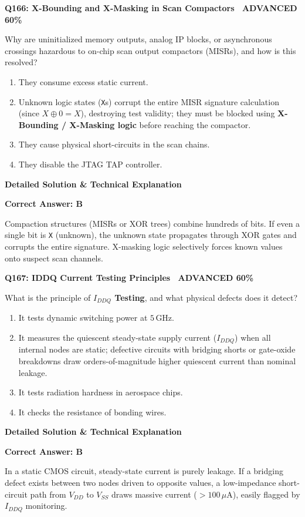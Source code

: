 \documentclass[11pt,a4paper]{article}
\newcommand{\badgeadv}{{\color{white}\colorbox{advred}{\bfseries\sffamily\tiny\ ADVANCED 60\%\ }}}
\newenvironment{qbox}[2]{%
  \begin{mdframed}[style=qstyle]%
  {\bfseries\sffamily\color{primaryblue}#1 \hfill #2}\par\vspace{2pt}%
}{%
  \end{mdframed}%
}
\newenvironment{ansbox}{%
  \begin{mdframed}[style=ansstyle]%
  {\bfseries\sffamily\color{ansgreen}\small Detailed Solution \& Technical Explanation}\par\vspace{2pt}\small%
}{%
  \end{mdframed}%
}
\begin{document}
\begin{qbox}{Q166: X-Bounding and X-Masking in Scan Compactors}{\badgeadv}
Why are uninitialized memory outputs, analog IP blocks, or asynchronous crossings hazardous to on-chip scan output compactors (MISRs), and how is this resolved?
\begin{enumerate}[label=\textbf{\Alph*.}]
  \item They consume excess static current.
  \item Unknown logic states (\texttt{X}s) corrupt the entire MISR signature calculation (since $X \oplus 0 = X$), destroying test validity; they must be blocked using \textbf{X-Bounding / X-Masking logic} before reaching the compactor.
  \item They cause physical short-circuits in the scan chains.
  \item They disable the JTAG TAP controller.
\end{enumerate}
\end{qbox}
\begin{ansbox}
\textbf{Correct Answer: B}

Compaction structures (MISRs or XOR trees) combine hundreds of bits. If even a single bit is \texttt{X} (unknown), the unknown state propagates through XOR gates and corrupts the entire signature. X-masking logic selectively forces known values onto suspect scan channels.
\end{ansbox}

\begin{qbox}{Q167: IDDQ Current Testing Principles}{\badgeadv}
What is the principle of \textbf{$I_{DDQ}$ Testing}, and what physical defects does it detect?
\begin{enumerate}[label=\textbf{\Alph*.}]
  \item It tests dynamic switching power at $5\,\text{GHz}$.
  \item It measures the quiescent steady-state supply current ($I_{DDQ}$) when all internal nodes are static; defective circuits with bridging shorts or gate-oxide breakdowns draw orders-of-magnitude higher quiescent current than nominal leakage.
  \item It tests radiation hardness in aerospace chips.
  \item It checks the resistance of bonding wires.
\end{enumerate}
\end{qbox}
\begin{ansbox}
\textbf{Correct Answer: B}

In a static CMOS circuit, steady-state current is purely leakage. If a bridging defect exists between two nodes driven to opposite values, a low-impedance short-circuit path from $V_{DD}$ to $V_{SS}$ draws massive current ($>100\,\mu\text{A}$), easily flagged by $I_{DDQ}$ monitoring.
\end{ansbox}
\end{document}
